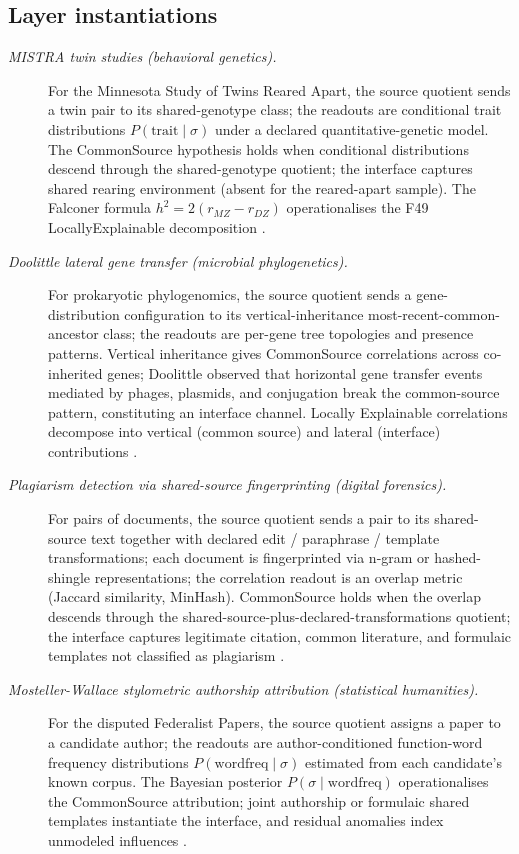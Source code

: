 \documentclass[11pt]{article}
\theoremstyle{definition}
\begin{document}
\subsection*{Layer instantiations}\label{layer-inst:F49}

\begin{description}
\item[\emph{{MISTRA} twin studies (behavioral
genetics).}]
For the Minnesota Study of Twins Reared Apart, the
source quotient sends a twin pair to its
shared-genotype class; the readouts are conditional
trait
distributions
\(P(\mathrm{trait}\mid\sigma)\) under a declared
quantitative-genetic model.  The CommonSource
hypothesis holds when conditional distributions
descend through the shared-genotype quotient; the
interface captures shared rearing environment
(absent for the reared-apart sample).  The Falconer
formula \(h^2=2(r_{MZ}-r_{DZ})\) operationalises the
F49 LocallyExplainable decomposition
\citep{Bouchard1990Sources}.

\item[\emph{Doolittle lateral gene transfer
(microbial phylogenetics).}]
For prokaryotic phylogenomics, the source quotient
sends a gene-distribution configuration to its
vertical-inheritance most-recent-common-ancestor
class; the readouts are per-gene tree topologies
and presence patterns.  Vertical inheritance gives
CommonSource correlations across co-inherited
genes; Doolittle observed that horizontal gene
transfer events mediated by phages, plasmids, and
conjugation break the common-source pattern,
constituting an interface channel.  Locally
Explainable correlations decompose into vertical
(common source) and lateral (interface)
contributions \citep{Doolittle1999Phylogenetic}.

\item[\emph{Plagiarism detection via shared-source
fingerprinting (digital forensics).}]
For pairs of documents, the source quotient sends
a pair to its shared-source text together with
declared edit / paraphrase / template
transformations; each document is fingerprinted via
n-gram or hashed-shingle representations; the
correlation readout is an overlap metric (Jaccard
similarity, MinHash).  CommonSource holds when the
overlap descends through the
shared-source-plus-declared-transformations
quotient; the interface
captures legitimate citation, common literature,
and formulaic templates not classified as
plagiarism \citep{Heintze1996Scalable}.

\item[\emph{Mosteller-Wallace stylometric authorship
attribution (statistical humanities).}]
For the disputed Federalist Papers, the source
quotient assigns a paper to a candidate author; the
readouts are author-conditioned function-word
frequency distributions
\(P(\mathrm{wordfreq}\mid\sigma)\) estimated from
each candidate's known corpus.  The Bayesian
posterior \(P(\sigma\mid\mathrm{wordfreq})\)
operationalises the CommonSource attribution; joint
authorship or formulaic shared templates
instantiate the interface, and residual anomalies
index unmodeled influences
\citep{MostellerWallace1964Federalist}.


\end{description}
\end{document}
